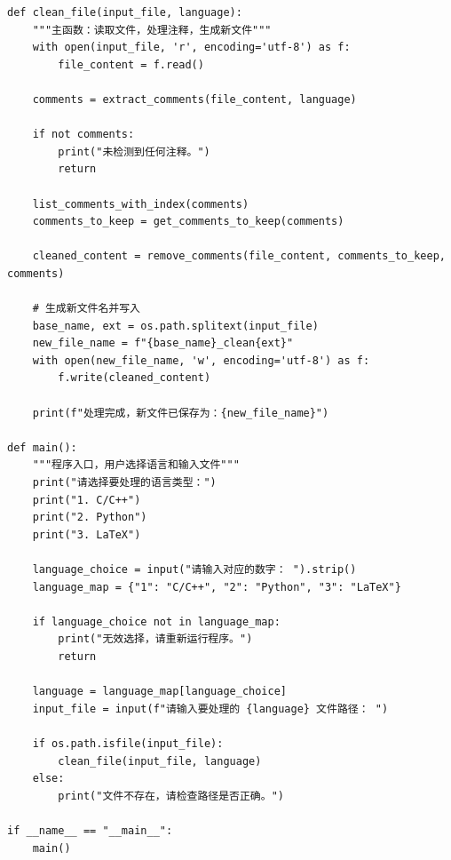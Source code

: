 \begin{lstlisting}[style=pythonstyle, title={删除文本注释.py}]
def clean_file(input_file, language):
    """主函数：读取文件，处理注释，生成新文件"""
    with open(input_file, 'r', encoding='utf-8') as f:
        file_content = f.read()

    comments = extract_comments(file_content, language)

    if not comments:
        print("未检测到任何注释。")
        return

    list_comments_with_index(comments)
    comments_to_keep = get_comments_to_keep(comments)

    cleaned_content = remove_comments(file_content, comments_to_keep, comments)

    # 生成新文件名并写入
    base_name, ext = os.path.splitext(input_file)
    new_file_name = f"{base_name}_clean{ext}"
    with open(new_file_name, 'w', encoding='utf-8') as f:
        f.write(cleaned_content)

    print(f"处理完成，新文件已保存为：{new_file_name}")

def main():
    """程序入口，用户选择语言和输入文件"""
    print("请选择要处理的语言类型：")
    print("1. C/C++")
    print("2. Python")
    print("3. LaTeX")

    language_choice = input("请输入对应的数字： ").strip()
    language_map = {"1": "C/C++", "2": "Python", "3": "LaTeX"}

    if language_choice not in language_map:
        print("无效选择，请重新运行程序。")
        return

    language = language_map[language_choice]
    input_file = input(f"请输入要处理的 {language} 文件路径： ")

    if os.path.isfile(input_file):
        clean_file(input_file, language)
    else:
        print("文件不存在，请检查路径是否正确。")

if __name__ == "__main__":
    main()
\end{lstlisting}

